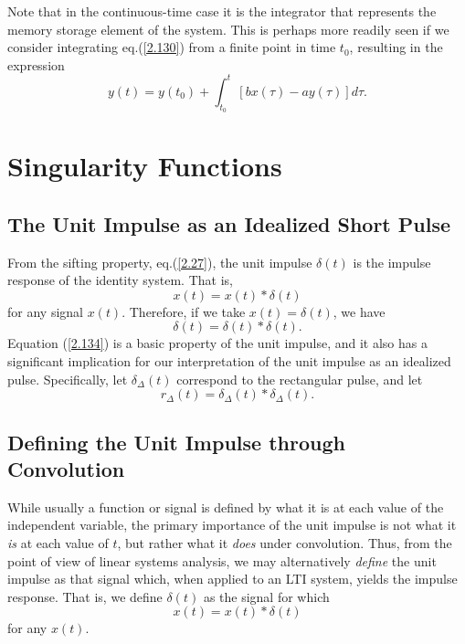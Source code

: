 \documentclass[a4paper,twoside]{book}
\begin{document}
Note that in the continuous-time case it is the integrator that represents the memory storage element of the system. This is perhaps more readily seen if we consider integrating eq.\;(\ref{2.130}) from a finite point in time $t_0$, resulting in the expression
\begin{equation}
    y(t) = y(t_0)+\int_{t_0}^t\left[bx(\tau)-ay(\tau)\right]d\tau.
    \label{2.132}
\end{equation}

\section{Singularity Functions}
\subsection{The Unit Impulse as an Idealized Short Pulse}

From the sifting property, eq.\;(\ref{2.27}), the unit impulse $\delta(t)$ is the impulse response of the identity system. That is,
\begin{equation}
    x(t)=x(t)*\delta(t)
    \label{2.133}
\end{equation}
for any signal $x(t)$. Therefore, if we take $x(t)=\delta(t)$, we have
\begin{equation}
    \delta(t)=\delta(t)*\delta(t).
    \label{2.134}
\end{equation}
Equation (\ref{2.134}) is a basic property of the unit impulse, and it also has a significant implication for our interpretation of the unit impulse as an idealized pulse. Specifically, let $\delta_\Delta(t)$ correspond to the rectangular pulse, and let
\begin{equation}
    r_\Delta(t)=\delta_\Delta(t)*\delta_\Delta(t).
    \label{2.135}
\end{equation}

\subsection{Defining the Unit Impulse through Convolution}

While usually a function or signal is defined by what it is at each value of the independent variable, the primary importance of the unit impulse is not what it \textit{is} at each value of $t$, but rather what it \textit{does} under convolution. Thus, from the point of view of linear systems analysis, we may alternatively \textit{define} the unit impulse as that signal which, when applied to an LTI system, yields the impulse response. That is, we define $\delta(t)$ as the signal for which
\begin{equation}
    x(t)=x(t)*\delta(t)
    \label{2.138}
\end{equation}
for any $x(t)$.
\end{document}
